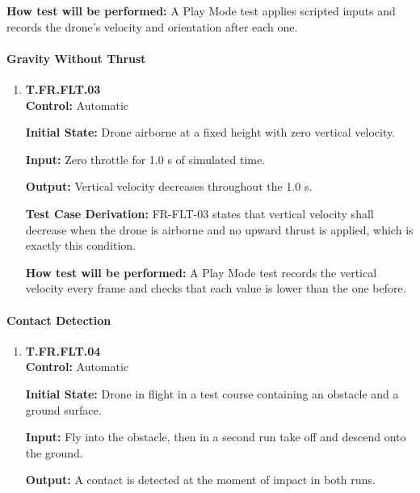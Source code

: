 \documentclass[12pt, titlepage]{article}
\begin{document}
{\begin{enumerate}
\textbf{How test will be performed:} A Play Mode test applies scripted inputs and
records the drone's velocity and orientation after each one.

\end{enumerate}

\paragraph{Gravity Without Thrust}

\begin{enumerate}

\item{\hypertarget{test-fr-fl03}{}\textbf{T.FR.FLT.03}\\}
\textbf{Control:} Automatic

\textbf{Initial State:} Drone airborne at a fixed height with zero vertical velocity.

\textbf{Input:} Zero throttle for 1.0 s of simulated time.

\textbf{Output:} Vertical velocity decreases throughout the 1.0 s.

\textbf{Test Case Derivation:} \mbox{FR-FLT-03} states that vertical velocity shall
decrease when the drone is airborne and no upward thrust is applied, which is exactly
this condition.

\textbf{How test will be performed:} A Play Mode test records the vertical velocity
every frame and checks that each value is lower than the one before.

\end{enumerate}

\paragraph{Contact Detection}

\begin{enumerate}

\item{\hypertarget{test-fr-fl04}{}\textbf{T.FR.FLT.04}\\}
\textbf{Control:} Automatic

\textbf{Initial State:} Drone in flight in a test course containing an obstacle and a
ground surface.

\textbf{Input:} Fly into the obstacle, then in a second run take off and descend onto
the ground.

\textbf{Output:} A contact is detected at the moment of impact in both runs.


\end{enumerate}}
\end{document}
